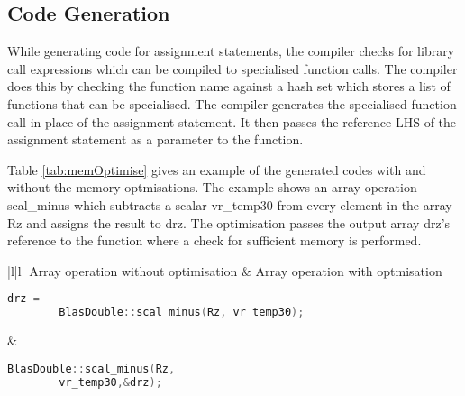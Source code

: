 \subsection{Code Generation}

While generating code for assignment statements, the compiler checks for library call expressions which can be compiled to specialised function calls. The compiler does this by checking the function name against a hash set which stores a list of functions that can be specialised. The compiler generates the specialised function call in place of the assignment statement. It then passes the reference LHS of the assignment statement as a parameter to the function. 

Table \ref{tab:memOptimise} gives an example of the generated codes with and without the memory optmisations. The example shows an array operation scal\_minus which subtracts a scalar vr\_temp30 from every element in the array Rz and assigns the result to drz.  The optimisation passes the output array drz's reference to the function where a check for sufficient memory is performed.
\begin{table}
  \begin{tabular}{|l|l|}
  \hline
  Array operation without optimisation & 
Array operation with optmisation 
   \\
  \hhline{|=|=|}
  
  {
  \begin{lstlisting}[language=c,frame=none, numbers=none]
	drz = 
		BlasDouble::scal_minus(Rz, vr_temp30);
  \end{lstlisting}
  } &
   {
   \begin{lstlisting}[language=c,frame=none, numbers=none]
	 BlasDouble::scal_minus(Rz, 
		vr_temp30,&drz);
   \end{lstlisting}
   } \\
   \hline
   \end{tabular}
   \caption[Generated code with and without memory optimisations]{Table shows the generated code with and without memory optimisations}
   \label{tab:memOptimise}
   \end{table}
